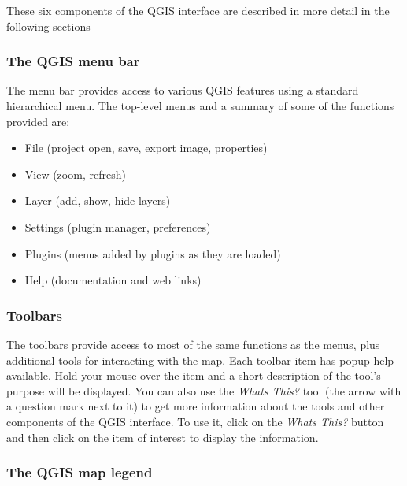 These six components of the QGIS interface are described in more detail in
the following sections 

\subsubsection{The QGIS menu bar}\label{label_menubar}

The menu bar provides access to various QGIS features using a standard 
hierarchical menu. The top-level menus and a summary of some of the
functions provided are:

\begin{itemize}
\item File (project open, save, export image, properties)
\item View (zoom, refresh)
\item Layer (add, show, hide layers)
\item Settings (plugin manager, preferences)
\item Plugins (menus added by plugins as they are loaded)
\item Help (documentation and web links)
\end{itemize}


\subsubsection{Toolbars}\label{label_toolbars}

The toolbars provide access to most of the same functions as the menus,
plus additional tools for interacting with the map. Each toolbar item has
popup help available. Hold your mouse over the item and a short description of
the tool's purpose will be displayed. You can also use the \textit{Whats
This?} tool (the arrow with a question mark next to it) to get more
information about the tools and other components of the QGIS interface. To use
it, click on the \textit{Whats This?} button and then click on the item of
interest to display the information. 


\subsubsection{The QGIS map legend}\label{label_legend}

